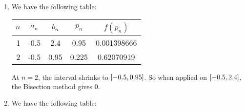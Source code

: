 \documentclass[../../Assignments.tex]{subfiles}
\begin{document}
\begin{solution}
\begin{enumerate}[label = (\alph*)]
        \item We have the following table:


            \begin{table}[H]
                \centering
                \begin{tabular}{r S[table-format=-1.1] S[table-format=1.2] S[table-format=1.3] S[table-format=1.9]}
                    \toprule
                    \(n\)  &   {\(a_n\)}   &   {\(b_n\)}   &   {\(p_n\)}   &  {\(f(p_n)\)}  \\
                      &  -0.5         &  2.4          &  0.95         &  0.001398666   \\
                        2  &  -0.5         &  0.95         &  0.225        &  0.62070919    \\
                    \bottomrule
                \end{tabular}
            \end{table}

            At \(n = 2\), the interval shrinks to
            \(\interval{\num{-0.5}}{\num{0.95}}\). So when applied on
            \(\interval{\num{-0.5}}{\num{2.4}}\), the Bisection method gives
            \(0\).

        \item We have the following table:


\end{enumerate}
\end{solution}
\end{document}
